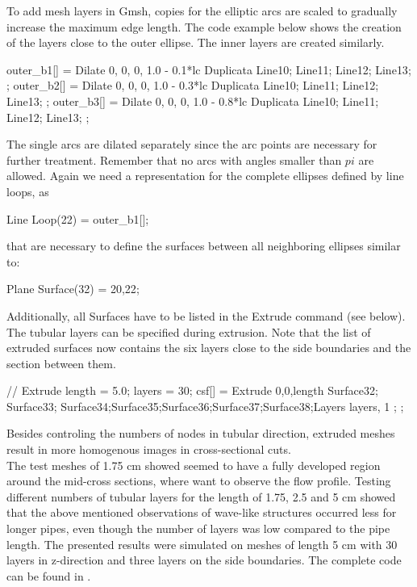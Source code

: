 To add mesh layers in Gmsh, copies for the elliptic arcs are scaled to gradually increase the maximum edge length. The code example below shows the creation of the layers close to the outer ellipse. The inner layers are created similarly.
\begin{code}
outer_b1[] = Dilate {{0, 0, 0}, 1.0 - 0.1*lc } { 
Duplicata{  Line{10}; Line{11}; Line{12}; Line{13}; } };
outer_b2[] = Dilate {{0, 0, 0}, 1.0 - 0.3*lc } { 
Duplicata{  Line{10}; Line{11}; Line{12}; Line{13}; } };
outer_b3[] = Dilate {{0, 0, 0}, 1.0 - 0.8*lc } { 
Duplicata{  Line{10}; Line{11}; Line{12}; Line{13}; } };
\end{code}
The single arcs are dilated separately since the arc points are necessary for further treatment. Remember that no arcs with angles smaller than $pi$ are allowed. Again we need a representation for the complete ellipses defined by line loops, as
\begin{code}
Line Loop(22) = {outer_b1[]};
\end{code}
that are necessary to define the surfaces between all neighboring ellipses similar to:
\begin{code}
Plane Surface(32) = {20,22};
\end{code}
Additionally, all Surfaces have to be listed in the Extrude command (see below).\\


The tubular layers can be specified during extrusion. Note that the list of extruded surfaces now contains the six layers close to the side boundaries and the section between them.
\begin{code}
// Extrude
length = 5.0;		
layers = 30;		
csf[] = Extrude {0,0,length} {Surface{32}; Surface{33};
   Surface{34};Surface{35};Surface{36};Surface{37};Surface{38};Layers{ {layers}, {1} }; };
\end{code}
Besides controling the numbers of nodes in tubular direction, extruded meshes result in more homogenous images in cross-sectional cuts.\\



The test meshes of 1.75 cm showed seemed to have a fully developed region around the mid-cross sections, where want to observe the flow profile. Testing different numbers of tubular layers for the length of 1.75, 2.5 and 5 cm showed that the above mentioned observations of wave-like structures occurred less for longer pipes, even though the number of layers was low compared to the pipe length.
The presented results were simulated on meshes of length 5 cm with 30 layers in z-direction and three layers on the side boundaries. The complete code can be found in %
.\\




